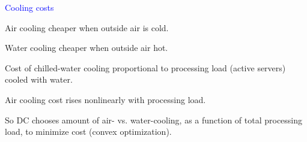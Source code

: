 \documentclass[xcolor=dvipsnames]{beamer}
\newcommand{\eqdef}{\ensuremath{\overset{\mathrm{def}}{=}}}
\begin{document}
\begin{frame}{\textcolor{blue}{Cooling costs}}

  




\vspace{2mm}

\begin{block}{Air cooling cheaper when outside air is cold. }
\begin{block}{Water cooling cheaper when outside air hot.}
\begin{block}{Cost of chilled-water cooling proportional to processing load (active servers) cooled with water.}  
\begin{block}{Air cooling cost rises nonlinearly with processing load.}
\begin{block}{So DC chooses amount of air- vs. water-cooling, as a function of total processing load, to minimize cost (convex optimization).}
\end{block}
\end{block}
\end{block}
\end{block}
\end{block}



\end{frame}
\end{document}
